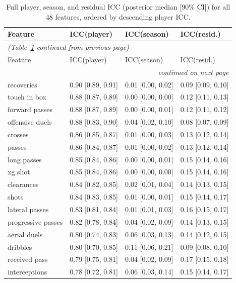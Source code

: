 
\begin{longtable}{llll}
\caption{Full player, season, and residual ICC (posterior median [90\% CI]) for all 48 features, ordered by
descending player ICC.}
\label{tab:icc-full}\\
\toprule
Feature & ICC(player) & ICC(season) & ICC(resid.)\\
\midrule
\endfirsthead
\multicolumn{4}{l}{\small\itshape (Table~\ref{tab:icc-full} continued from previous page)}\\
\toprule
Feature & ICC(player) & ICC(season) & ICC(resid.)\\
\midrule
\endhead
\midrule
\multicolumn{4}{r}{\small\itshape continued on next page}\\
\endfoot
\bottomrule
\endlastfoot
recoveries & 0.90 [0.89, 0.91] & 0.01 [0.00, 0.02] & 0.09 [0.09, 0.10]\\
touch in box & 0.88 [0.87, 0.89] & 0.00 [0.00, 0.00] & 0.12 [0.11, 0.13]\\
forward passes & 0.88 [0.87, 0.89] & 0.00 [0.00, 0.01] & 0.12 [0.11, 0.12]\\
offensive duels & 0.88 [0.83, 0.90] & 0.04 [0.02, 0.10] & 0.08 [0.07, 0.09]\\
crosses & 0.86 [0.85, 0.87] & 0.01 [0.00, 0.03] & 0.13 [0.12, 0.14]\\
passes & 0.86 [0.84, 0.87] & 0.01 [0.00, 0.02] & 0.13 [0.12, 0.14]\\
long passes & 0.85 [0.84, 0.86] & 0.00 [0.00, 0.01] & 0.15 [0.14, 0.16]\\
xg shot & 0.85 [0.84, 0.86] & 0.00 [0.00, 0.00] & 0.15 [0.14, 0.16]\\
clearances & 0.84 [0.82, 0.85] & 0.02 [0.01, 0.04] & 0.14 [0.13, 0.15]\\
shots & 0.84 [0.83, 0.85] & 0.01 [0.00, 0.01] & 0.15 [0.14, 0.17]\\
lateral passes & 0.83 [0.81, 0.84] & 0.01 [0.01, 0.03] & 0.16 [0.15, 0.17]\\
progressive passes & 0.82 [0.78, 0.84] & 0.04 [0.02, 0.09] & 0.14 [0.13, 0.15]\\
aerial duels & 0.80 [0.74, 0.83] & 0.06 [0.03, 0.13] & 0.14 [0.12, 0.15]\\
dribbles & 0.80 [0.70, 0.85] & 0.11 [0.06, 0.21] & 0.09 [0.08, 0.10]\\
received pass & 0.79 [0.75, 0.81] & 0.04 [0.02, 0.09] & 0.17 [0.15, 0.18]\\
interceptions & 0.78 [0.72, 0.81] & 0.06 [0.03, 0.14] & 0.15 [0.14, 0.17]\\

\end{longtable}
